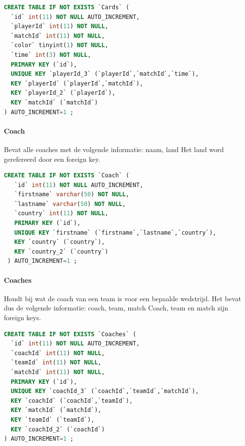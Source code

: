 \documentclass[11pt]{article}
\begin{document}
        \begin{framed}
        \begin{lstlisting}[language=sql]
CREATE TABLE IF NOT EXISTS `Cards` (
  `id` int(11) NOT NULL AUTO_INCREMENT,
  `playerId` int(11) NOT NULL,
  `matchId` int(11) NOT NULL,
  `color` tinyint(1) NOT NULL,
  `time` int(3) NOT NULL,
  PRIMARY KEY (`id`),
  UNIQUE KEY `playerId_3` (`playerId`,`matchId`,`time`),
  KEY `playerId` (`playerId`,`matchId`),
  KEY `playerId_2` (`playerId`),
  KEY `matchId` (`matchId`)
) AUTO_INCREMENT=1 ;
        \end{lstlisting}
        \end{framed}
    
    
    \paragraph{Coach}
        Bevat alle coaches met de volgende informatie:
            naam, land
        Het land word gerefereerd door een foreign key.
        
        \begin{framed}
        \begin{lstlisting}[language=sql]
 CREATE TABLE IF NOT EXISTS `Coach` (
   `id` int(11) NOT NULL AUTO_INCREMENT,
   `firstname` varchar(50) NOT NULL,
   `lastname` varchar(50) NOT NULL,
   `country` int(11) NOT NULL,
   PRIMARY KEY (`id`),
   UNIQUE KEY `firstname` (`firstname`,`lastname`,`country`),
   KEY `country` (`country`),
   KEY `country_2` (`country`)
 ) AUTO_INCREMENT=1 ;
        \end{lstlisting}
        \end{framed}
        
        
        
    \paragraph{Coaches}
        Houdt bij wat de coach van een team is voor een bepaalde wedstrijd. Het bevat dus de volgende informatie:
            coach, team, match
        Coach, team en match zijn foreign keys.
        
        \begin{framed}
        \begin{lstlisting}[language=sql]
CREATE TABLE IF NOT EXISTS `Coaches` (
  `id` int(11) NOT NULL AUTO_INCREMENT,
  `coachId` int(11) NOT NULL,
  `teamId` int(11) NOT NULL,
  `matchId` int(11) NOT NULL,
  PRIMARY KEY (`id`),
  UNIQUE KEY `coachId_3` (`coachId`,`teamId`,`matchId`),
  KEY `coachId` (`coachId`,`teamId`),
  KEY `matchId` (`matchId`),
  KEY `teamId` (`teamId`),
  KEY `coachId_2` (`coachId`)
) AUTO_INCREMENT=1 ;
        \end{lstlisting}
        \end{framed}
        
\end{document}
